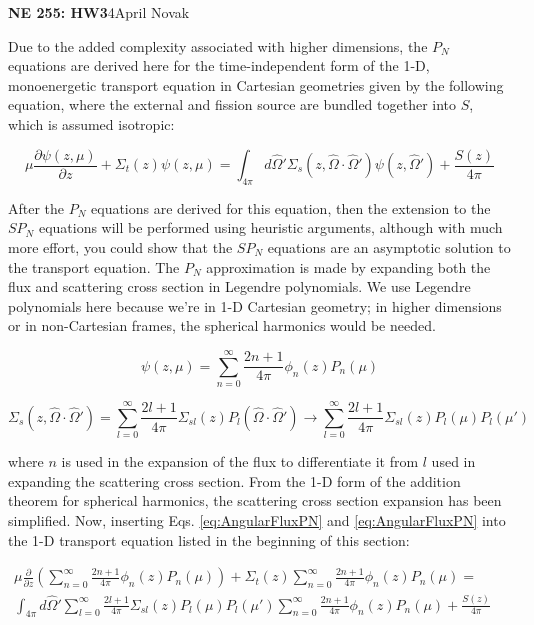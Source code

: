 \documentclass[10pt]{article}
\newcommand*\circled[1]{\tikz[baseline=(char.base)]{
            \node[shape=circle,draw,inner sep=2pt] (char) {#1};}}
\begin{document}
\textbf{NE 255: HW3}4\hfill April Novak\newline

\circled{1} Due to the added complexity associated with higher dimensions, the \(P_N\) equations are derived here for the time-independent form of the 1-D, monoenergetic transport equation in Cartesian geometries given by the following equation, where the external and fission source are bundled together into \(S\), which is assumed isotropic:

\begin{equation*}
\mu \frac{\partial \psi(z, \mu)}{\partial z} +
 \Sigma_t(z)\psi(z, \mu) =\int_{4\pi}^{} d\hat{\Omega}' \Sigma_s(z, \hat{\Omega}\cdot\hat{\Omega}')\psi(z,\hat{\Omega}') + \frac{S(z)}{4\pi}
 \end{equation*}

After the \(P_N\) equations are derived for this equation, then the extension to the \(SP_N\) equations will be performed using heuristic arguments, although with much more effort, you could show that the \(SP_N\) equations are an asymptotic solution to the transport equation. The \(P_N\) approximation is made by expanding both the flux and scattering cross section in Legendre polynomials. We use Legendre polynomials here because we're in 1-D Cartesian geometry; in higher dimensions or in non-Cartesian frames, the spherical harmonics would be needed.

\begin{equation}
\label{eq:AngularFluxPN}
\psi(z,\mu)=\sum_{n=0}^{\infty}\frac{2n+1}{4\pi}\phi_n(z)P_n(\mu)
\end{equation}

\begin{equation}
\label{eq:PNScatteringCrossSectionExpansion}
\Sigma_s(z,\hat{\Omega}\cdot\hat{\Omega}')=\sum_{l=0}^{\infty}\frac{2l+1}{4\pi}\Sigma_{sl}(z)P_l(\hat{\Omega}\cdot\hat{\Omega}')\rightarrow\sum_{l=0}^{\infty}\frac{2l+1}{4\pi}\Sigma_{sl}(z)P_l(\mu)P_l(\mu')
\end{equation}

where \(n\) is used in the expansion of the flux to differentiate it from \(l\) used in expanding the scattering cross section. From the 1-D form of the addition theorem for spherical harmonics, the scattering cross section expansion has been simplified. Now, inserting Eqs. \eqref{eq:AngularFluxPN} and \eqref{eq:AngularFluxPN} into the 1-D transport equation listed in the beginning of this section:

\begin{equation}
\begin{aligned}
\mu \frac{\partial}{\partial z}\left(\sum_{n=0}^{\infty}\frac{2n+1}{4\pi}\phi_n(z)P_n(\mu)\right) + \Sigma_t(z)\sum_{n=0}^{\infty}\frac{2n+1}{4\pi}\phi_n(z)P_n(\mu) =\quad\quad\\
\int_{4\pi}^{} d\hat{\Omega}' \sum_{l=0}^{\infty}\frac{2l+1}{4\pi}\Sigma_{sl}(z)P_l(\mu)P_l(\mu')\sum_{n=0}^{\infty}\frac{2n+1}{4\pi}\phi_n(z)P_n(\mu) + \frac{S(z)}{4\pi}
 \end{aligned}
 \end{equation}
\end{document}
